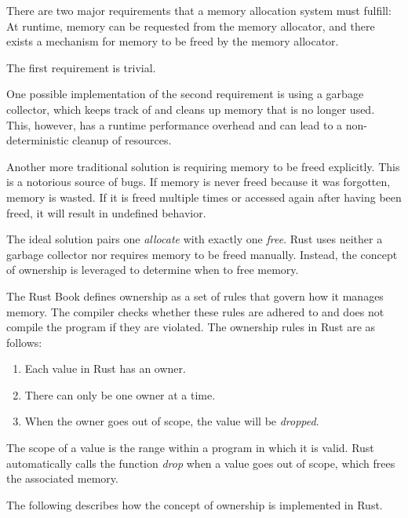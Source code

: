 \documentclass[sigplan,11pt,nonacm]{acmart}
\begin{document}
There are two major requirements that a memory allocation system must fulfill:
At runtime, memory can be requested from the memory allocator, and there exists a mechanism for memory to be freed by the memory allocator.

The first requirement is trivial.

One possible implementation of the second requirement is using a garbage collector, which keeps track of and cleans up memory that is no longer used.
This, however, has a runtime performance overhead and can lead to a non-deterministic cleanup of resources.

Another more traditional solution is requiring memory to be freed explicitly.
This is a notorious source of bugs.
If memory is never freed because it was forgotten, memory is wasted.
If it is freed multiple times or accessed again after having been freed, it will result in undefined behavior.

The ideal solution pairs one \emph{allocate} with exactly one \emph{free}.
Rust uses neither a garbage collector nor requires memory to be freed manually.
Instead, the concept of ownership is leveraged to determine when to free memory.

The Rust Book \cite{rust-book} defines ownership as a set of rules that govern how it manages memory.
The compiler checks whether these rules are adhered to and does not compile the program if they are violated.
The ownership rules in Rust are as follows:
\begin{enumerate}
  \item Each value in Rust has an owner.
  \item There can only be one owner at a time.
  \item When the owner goes out of scope, the value will be \emph{dropped}.
\end{enumerate}
The scope of a value is the range within a program in which it is valid.
Rust automatically calls the function \emph{drop} when a value goes out of scope, which frees the associated memory.

The following describes how the concept of ownership is implemented in Rust.

\end{document}

